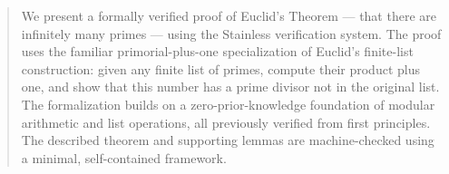 \begin{abstract}
We present a formally verified proof of Euclid's Theorem --- that there are
infinitely many primes --- using the Stainless verification system. The
proof uses the familiar primorial-plus-one specialization of Euclid's
finite-list construction: given any finite list of primes, compute their
product plus one, and show that this number has a prime divisor not in the
original list. The formalization builds on a zero-prior-knowledge foundation
of modular arithmetic and list operations, all previously verified from
first principles. The described theorem and supporting lemmas are
machine-checked using a minimal, self-contained framework.
\end{abstract}
